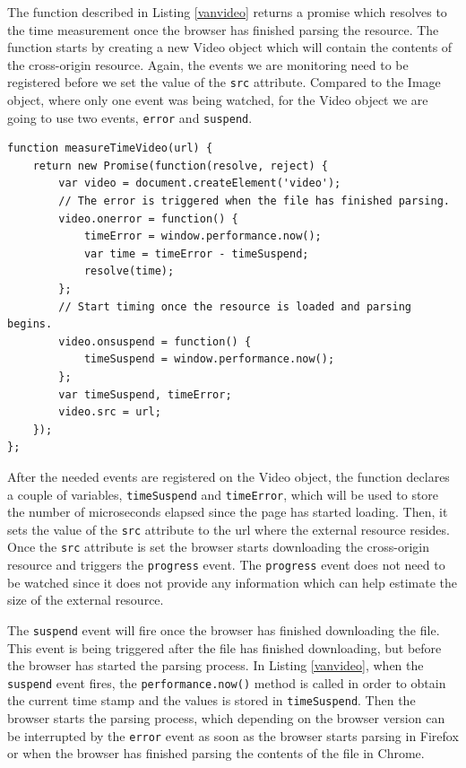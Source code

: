 \documentclass[10pt,a4paper,twoside]{book}
\begin{document}
The function described in Listing \ref{vanvideo} returns a promise which resolves to the time measurement once the browser has finished parsing the resource. The function starts  by creating a new Video object which will contain the contents of the cross-origin resource. Again, the events we are monitoring need to be registered before we set the value of the \texttt{src} attribute. Compared to the Image object, where only one event was being watched, for the Video object we are going to use two events, \texttt{error} and \texttt{suspend}.

\begin{lstlisting}[caption={Measuring the load time of an external resource as a Video},label={vanvideo}]
function measureTimeVideo(url) {
	return new Promise(function(resolve, reject) {
		var video = document.createElement('video');
        // The error is triggered when the file has finished parsing.
		video.onerror = function() {
			timeError = window.performance.now();
			var time = timeError - timeSuspend;
			resolve(time);
		};
		// Start timing once the resource is loaded and parsing begins.
		video.onsuspend = function() {
			timeSuspend = window.performance.now();
		};
		var timeSuspend, timeError;
		video.src = url;
	});
};
\end{lstlisting}

After the needed events are registered on the Video object, the function declares a couple of variables, \texttt{timeSuspend} and \texttt{timeError}, which will be used to store the number of microseconds elapsed since the page has started loading. Then, it sets the value of the \texttt{src} attribute to the url where the external resource resides. Once the \texttt{src} attribute is set the browser starts downloading the cross-origin resource and triggers the \texttt{progress} event. The \texttt{progress} event does not need to be watched since it does not provide any information which can help estimate the size of the external resource. 

The \texttt{suspend} event will fire once the browser has finished downloading the file. This event is being triggered after the file has finished downloading, but before the browser has started the parsing process. In Listing \ref{vanvideo}, when the \texttt{suspend} event fires, the \texttt{performance.now()} method is called in order to obtain the current time stamp and the values is stored in \texttt{timeSuspend}. Then the browser starts the parsing process, which depending on the browser version can be interrupted by the \texttt{error} event as soon as the browser starts parsing in Firefox or when the browser has finished parsing the contents of the file in Chrome. 
\end{document}
